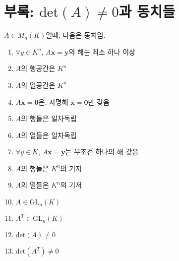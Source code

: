 \documentclass[oneside]{oblivoir}
\begin{document}
\section{부록: $\mathrm{det}(A) \ne 0$과 동치들}
$A \in M_n (K)$일때, 다음은 동치임.
\begin{enumerate}
    \item $\forall y \in K^n$, $A\mathbf{x}=\mathbf{y}$의 해는 최소 하나 이상
    \item $A$의 행공간은 $K^n$
    \item $A$의 열공간은 $K^n$
    \item $A\mathbf{x}=\mathbf{0}$은, 자명해 $\mathbf{x}=\mathbf{0}$만 갖음
    \item $A$의 행들은 일차독립
    \item $A$의 열들은 일차독립
    \item $\forall y \in K$, $A\mathbf{x}=\mathbf{y}$는 무조건 하나의 해 갖음
    \item $A$의 행들은 $K^n$의 기저
    \item $A$의 열들은 $K^n$의 기저
    \item $A \in \mathrm{GL}_n(K)$
    \item $A^T \in \mathrm{GL}_n(K)$
    \item $\mathrm{det}(A) \ne 0$
    \item $\mathrm{det}(A^T) \ne 0$
\end{enumerate}
\end{document}
